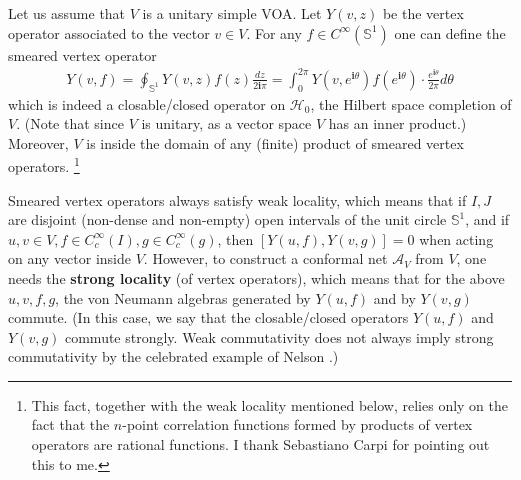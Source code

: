 \documentclass[11pt,b5paper,notitlepage]{article}
\theoremstyle{definition}
\theoremstyle{plain}
\newcommand{\mc}{\mathcal}
\newcommand{\im}{\mathbf{i}}
\newcommand{\mbb}{\mathbb}
\numberwithin{equation}{subsection}
\begin{document}
Let us assume that $V$ is a unitary simple VOA.  Let $Y(v,z)$ be the vertex operator associated to the vector $v\in V$. For any $f\in C^\infty(\mbb S^1)$ one can define the smeared vertex operator
\begin{align}
Y(v,f)=\oint_{\mbb S^1} Y(v,z)f(z)\frac{dz}{2\im\pi}=\int_0^{2\pi}Y(v,e^{\im\theta})f(e^{\im\theta})\cdot\frac{e^{\im\theta}}{2\pi}d\theta
\end{align}
which is indeed a closable/closed operator on $\mc H_0$, the Hilbert space completion of $V$. (Note that since $V$ is unitary, as a vector space $V$ has an inner product.) Moreover, $V$ is inside the domain of any (finite) product of smeared vertex operators. \footnote{This fact, together with the weak locality mentioned below, relies only on the fact that the $n$-point correlation functions formed by products of vertex operators are rational functions. I thank Sebastiano Carpi for pointing out this to me.}

Smeared vertex operators always satisfy weak locality, which means that if $I,J$ are disjoint (non-dense and non-empty) open intervals of the unit circle $\mbb S^1$, and if $u,v\in V,f\in C_c^\infty(I),g\in C_c^\infty(g)$, then $[Y(u,f),Y(v,g)]=0$ when acting on any vector inside $V$. However, to construct a conformal net $\mc A_V$ from $V$, one needs the \textbf{strong locality} (of vertex operators), which means that for the above $u,v,f,g$, the von Neumann algebras generated by $Y(u,f)$ and by $Y(v,g)$ commute. (In this case, we say that the closable/closed operators $Y(u,f)$ and $Y(v,g)$ commute strongly. Weak commutativity does not always imply strong commutativity by the celebrated example of Nelson \cite{Nel59}.) 
\end{document}
